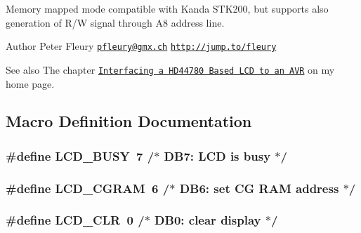 Memory mapped mode compatible with Kanda S\+T\+K200, but supports also generation of R/W signal through A8 address line.

\begin{DoxyAuthor}{Author}
Peter Fleury \href{mailto:pfleury@gmx.ch}{\tt pfleury@gmx.\+ch} \href{http://jump.to/fleury}{\tt http\+://jump.\+to/fleury}
\end{DoxyAuthor}
\begin{DoxySeeAlso}{See also}
The chapter \href{http://homepage.sunrise.ch/mysunrise/peterfleury/avr-lcd44780.html}{\tt Interfacing a H\+D44780 Based L\+CD to an A\+VR} on my home page. 
\end{DoxySeeAlso}


\subsection{Macro Definition Documentation}
\subsubsection[{\texorpdfstring{L\+C\+D\+\_\+\+B\+U\+SY}{LCD_BUSY}}]{\setlength{\rightskip}{0pt plus 5cm}\#define L\+C\+D\+\_\+\+B\+U\+SY~7      /$\ast$ D\+B7\+: L\+CD is busy                    $\ast$/}\hypertarget{group__pfleury__lcd_gac8dd1658e235f174d1cabae5c438943d}{}\label{group__pfleury__lcd_gac8dd1658e235f174d1cabae5c438943d}
\subsubsection[{\texorpdfstring{L\+C\+D\+\_\+\+C\+G\+R\+AM}{LCD_CGRAM}}]{\setlength{\rightskip}{0pt plus 5cm}\#define L\+C\+D\+\_\+\+C\+G\+R\+AM~6      /$\ast$ D\+B6\+: set CG R\+AM address             $\ast$/}\hypertarget{group__pfleury__lcd_ga3b38de74c362be1781fef1136aa9684c}{}\label{group__pfleury__lcd_ga3b38de74c362be1781fef1136aa9684c}
\subsubsection[{\texorpdfstring{L\+C\+D\+\_\+\+C\+LR}{LCD_CLR}}]{\setlength{\rightskip}{0pt plus 5cm}\#define L\+C\+D\+\_\+\+C\+LR~0      /$\ast$ D\+B0\+: clear display                  $\ast$/}\hypertarget{group__pfleury__lcd_ga459688213267d13ccfbeb2c9004988cb}{}\label{group__pfleury__lcd_ga459688213267d13ccfbeb2c9004988cb}
